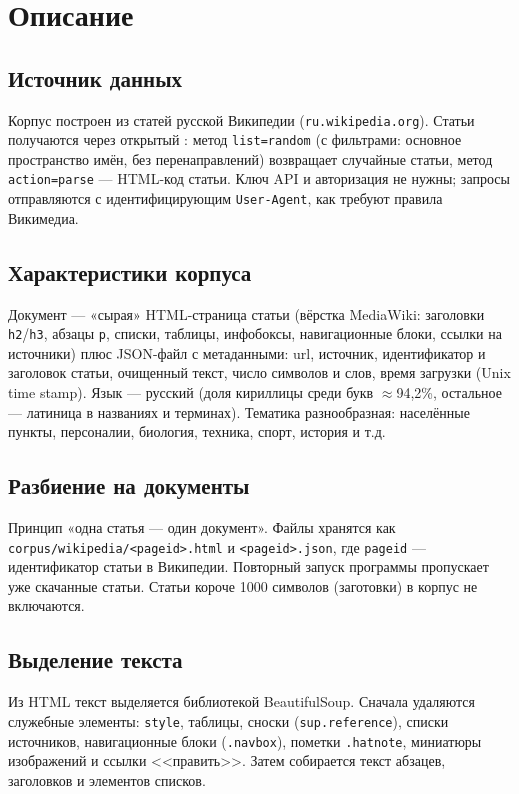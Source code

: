 \section{Описание}

\subsection{Источник данных}
Корпус построен из статей русской Википедии (\texttt{ru.wikipedia.org}).
Статьи получаются через открытый :
метод \texttt{list=random} (с фильтрами: основное пространство имён, без
перенаправлений) возвращает случайные статьи, метод \texttt{action=parse} ---
HTML-код статьи. Ключ API и авторизация не нужны; запросы отправляются с
идентифицирующим \texttt{User-Agent}, как требуют правила Викимедиа.

\subsection{Характеристики корпуса}
Документ --- «сырая» HTML-страница статьи (вёрстка MediaWiki: заголовки
\texttt{h2}/\texttt{h3}, абзацы \texttt{p}, списки, таблицы, инфобоксы,
навигационные блоки, ссылки на источники) плюс JSON-файл с метаданными: url,
источник, идентификатор и заголовок статьи, очищенный текст, число символов и
слов, время загрузки (Unix time stamp). Язык --- русский (доля кириллицы среди
букв $\approx$94{,}2\%, остальное --- латиница в названиях и терминах).
Тематика разнообразная: населённые пункты, персоналии, биология, техника,
спорт, история и т.д.

\subsection{Разбиение на документы}
Принцип «одна статья --- один документ». Файлы хранятся как
\texttt{corpus/wikipedia/<pageid>.html} и \texttt{<pageid>.json}, где
\texttt{pageid} --- идентификатор статьи в Википедии. Повторный запуск
программы пропускает уже скачанные статьи. Статьи короче 1000 символов
(заготовки) в корпус не включаются.

\subsection{Выделение текста}
Из HTML текст выделяется библиотекой BeautifulSoup. Сначала удаляются
служебные элементы: \texttt{style}, таблицы, сноски (\texttt{sup.reference}),
списки источников, навигационные блоки (\texttt{.navbox}), пометки
\texttt{.hatnote}, миниатюры изображений и ссылки <<править>>. Затем
собирается текст абзацев, заголовков и элементов списков.

